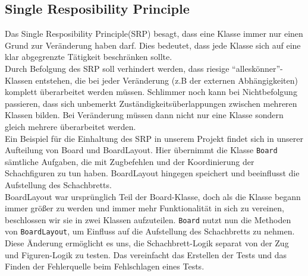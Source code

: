 \documentclass[
10pt, %
a4paper, %
oneside, %
headinclude,footinclude, %
BCOR5mm, %
]{scrartcl}
\begin{document}
\begin{onehalfspace}
\subsection{Single Resposibility Principle}
Das Single Resposibility Principle(SRP) besagt, dass eine Klasse immer nur einen Grund zur Veränderung haben darf. Dies bedeutet, dass jede Klasse sich auf eine klar abgegrenzte Tätigkeit beschränken sollte. 
\\
Durch Befolgung des SRP soll verhindert werden, dass riesige \enquote{alleskönner}-Klassen entstehen, die bei jeder Veränderung (z.B der externen Abhängigkeiten) komplett überarbeitet werden müssen. Schlimmer noch kann bei Nichtbefolgung passieren, dass sich unbemerkt Zuständigkeitsüberlappungen zwischen mehreren Klassen bilden. Bei Veränderung müssen dann nicht nur eine Klasse sondern gleich mehrere überarbeitet werden.
\\
Ein Beispiel für die Einhaltung des SRP in unserem Projekt findet sich in unserer Aufteilung von Board und BoardLayout. Hier übernimmt die Klasse \texttt{Board} sämtliche Aufgaben, die mit Zugbefehlen und der Koordinierung der Schachfiguren zu tun haben. BoardLayout hingegen speichert und beeinflusst die Aufstellung des Schachbretts.
\\
BoardLayout war ursprünglich Teil der Board-Klasse, doch als die Klasse begann immer größer zu werden und immer mehr Funktionalität in sich zu vereinen, beschlossen wir sie in zwei Klassen aufzuteilen.
\texttt{Board} nutzt nun die Methoden von \texttt{BoardLayout}, um Einfluss auf die Aufstellung des Schachbretts zu nehmen.
\\
Diese Änderung ermöglicht es uns, die Schachbrett-Logik separat von der Zug und Figuren-Logik zu testen. Das vereinfacht das Erstellen der Tests und das Finden der Fehlerquelle beim Fehlschlagen eines Tests.

\end{onehalfspace}
\end{document}
